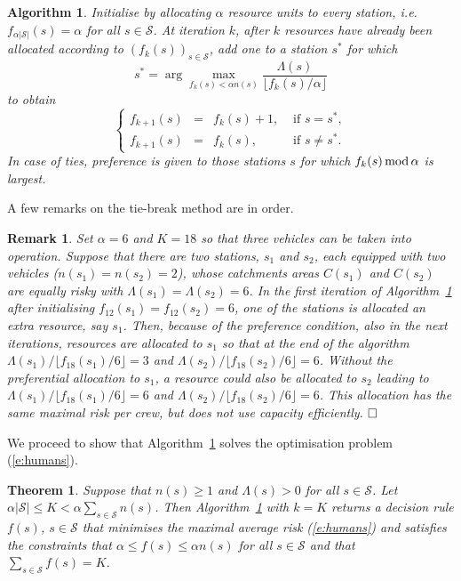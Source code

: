 \documentclass[twoside,11pt]{article}
\newtheorem{theorem}{Theorem}[section]
\newtheorem{algorithm}{Algorithm}[section]
\newtheorem{remark}{Remark}[section]
\begin{document}
\begin{algorithm}
Initialise by allocating $\alpha$ resource units to every station,
i.e. $f_{\alpha |\mathcal{S}|}(s) = \alpha$ for all $s\in \mathcal{S}$.
At iteration $k$, after $k$ resources have already been 
allocated according to $(f_k(s))_{s\in\mathcal{S}}$, 
add one to a station $s^*$ for which 
\[
s^* = \arg\max_{ f_k(s) < \alpha n(s)} 
  \frac{\Lambda(s)}{ \lfloor f_k(s)/ \alpha \rfloor}
\]
to obtain 
\[
\left\{ \begin{array}{llll}
    f_{k+1}(s) & = & f_k(s) + 1,  & \mbox{ if } s = s^*, \\
    f_{k+1}(s) & = & f_k(s), & \mbox{ if } s\neq s^*.
\end{array} \right.
\]
In case of ties, preference is given to those stations
$s$ for which $f_k(s) \, \rm{mod} \, \alpha$ is largest.
\label{A:men}
\end{algorithm}

A few remarks on the tie-break method are in order. 

\begin{remark}
{\rm Set $\alpha = 6$ and $K=18$ so that three vehicles can 
be taken into operation. Suppose that there are two stations, 
$s_1$ and $s_2$, each equipped with two vehicles ($n(s_1) 
= n(s_2) = 2$), whose catchments areas $C(s_1)$ and $C(s_2)$ 
are equally risky with $\Lambda(s_1) = \Lambda(s_2) = 6$.
In the first iteration of Algorithm~\ref{A:men} after 
initialising $f_{12}(s_1) = f_{12}(s_2) = 6$, 
one of the stations is allocated an extra resource, say $s_1$. 
Then, because of the preference condition, also in the next 
iterations, resources are allocated to $s_1$ so that 
at the end of the algorithm 
$\Lambda(s_1)/ \lfloor f_{18}(s_1)/6 \rfloor = 3$ and 
$\Lambda(s_2)/ \lfloor f_{18}(s_2)/6 \rfloor = 6$. Without
the preferential allocation to $s_1$, a resource
could also be allocated to $s_2$ leading to 
$\Lambda(s_1)/ \lfloor f_{18}(s_1) /6 \rfloor = 6$ and 
$\Lambda(s_2)/ \lfloor f_{18}(s_2) /6  \rfloor = 6$.
This allocation has the same maximal risk per crew, but 
does not use capacity efficiently.} $\hfill\Box$
\end{remark}

We proceed to show that Algorithm~\ref{A:men} solves the 
optimisation problem (\ref{e:humans}).

\begin{theorem} \label{t:personnel}
Suppose that $n(s) \geq 1$ and $\Lambda(s) > 0$ for all $s\in \mathcal{S}$.
Let $\alpha |\mathcal{S}| \leq K < \alpha \sum_{s\in \mathcal{S}} n(s)$.
Then Algorithm~\ref{A:men} with $k=K$ returns a decision rule $f(s)$,
$s\in \mathcal{S}$ that minimises the maximal average risk (\ref{e:humans}) 
and satisfies the constraints that $\alpha \leq f(s) \leq \alpha n(s)$ 
for all $s\in \mathcal{S}$ and that $\sum_{s\in \mathcal{S}} f(s) = K$.
\end{theorem}
\end{document}
